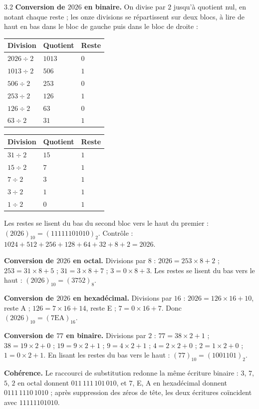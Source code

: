 \begin{corrige}{3.2}
\textbf{Conversion de $2026$ en binaire.} On divise par $2$ jusqu'à quotient nul, en notant chaque reste ; les onze divisions se répartissent sur deux blocs, à lire de haut en bas dans le bloc de gauche puis dans le bloc de droite :
\begin{center}
\begin{tabular}{C{1.9cm}C{1.7cm}C{1.3cm}}
\toprule
{}Division & Quotient & Reste \\
\midrule
$2026 \div 2$ & $1013$ & $0$ \\
$1013 \div 2$ & $506$ & $1$ \\
$506 \div 2$ & $253$ & $0$ \\
$253 \div 2$ & $126$ & $1$ \\
$126 \div 2$ & $63$ & $0$ \\
$63 \div 2$ & $31$ & $1$ \\
\bottomrule
\end{tabular}
\qquad
\begin{tabular}{C{1.9cm}C{1.7cm}C{1.3cm}}
\toprule
{}Division & Quotient & Reste \\
\midrule
$31 \div 2$ & $15$ & $1$ \\
$15 \div 2$ & $7$ & $1$ \\
$7 \div 2$ & $3$ & $1$ \\
$3 \div 2$ & $1$ & $1$ \\
$1 \div 2$ & $0$ & $1$ \\
\bottomrule
\end{tabular}
\end{center}
Les restes se lisent du bas du second bloc vers le haut du premier : $(2026)_{10} = (11111101010)_2$. Contrôle : $1024 + 512 + 256 + 128 + 64 + 32 + 8 + 2 = 2026$.

\textbf{Conversion de $2026$ en octal.} Divisions par $8$ : $2026 = 253 \times 8 + 2$ ; $253 = 31 \times 8 + 5$ ; $31 = 3 \times 8 + 7$ ; $3 = 0 \times 8 + 3$. Les restes se lisent du bas vers le haut : $(2026)_{10} = (3752)_8$.

\textbf{Conversion de $2026$ en hexadécimal.} Divisions par $16$ : $2026 = 126 \times 16 + 10$, reste A ; $126 = 7 \times 16 + 14$, reste E ; $7 = 0 \times 16 + 7$. Donc $(2026)_{10} = (7\mathrm{EA})_{16}$.

\textbf{Conversion de $77$ en binaire.} Divisions par $2$ : $77 = 38 \times 2 + 1$ ; $38 = 19 \times 2 + 0$ ; $19 = 9 \times 2 + 1$ ; $9 = 4 \times 2 + 1$ ; $4 = 2 \times 2 + 0$ ; $2 = 1 \times 2 + 0$ ; $1 = 0 \times 2 + 1$. En lisant les restes du bas vers le haut : $(77)_{10} = (1001101)_2$.

\textbf{Cohérence.} Le raccourci de substitution redonne la même écriture binaire : $3$, $7$, $5$, $2$ en octal donnent $011\,111\,101\,010$, et $7$, E, A en hexadécimal donnent $0111\,1110\,1010$ ; après suppression des zéros de tête, les deux écritures coïncident avec $11111101010$.
\end{corrige}

